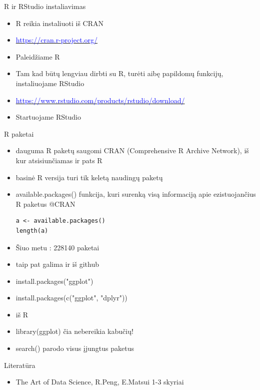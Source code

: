 \documentclass[11pt,xcolor=table]{beamer}
\begin{document}

\begin{frame}{R ir RStudio instaliavimas}
\begin{itemize}
\item R reikia instaliuoti iš CRAN
\item \href{https://cran.r-project.org/}{\textcolor{blue}{https://cran.r-project.org/}}
\item Paleidžiame R 
\item Tam kad būtų lengviau dirbti su R, turėti aibę papildomų funkcijų, instaliuojame RStudio
\item \href{https://www.rstudio.com/products/rstudio/download/}{\textcolor{blue}{https://www.rstudio.com/products/rstudio/download/}}
\item Startuojame RStudio
\end{itemize}
\end{frame}


\begin{frame}[fragile]{R paketai}
\begin{itemize}
\item dauguma R paketų saugomi CRAN (Comprehensive R Archive Network), iš kur atsisiunčiamas ir pats R
\item basinė R versija turi tik keletą naudingų paketų
\item available.packages() funkcija, kuri surenką visą informaciją apie ezistuojančius R paketus @CRAN
\begin{lstlisting}
a <- available.packages()
length(a)
\end{lstlisting}
\item Šiuo metu : 228140 paketai
\item taip pat galima ir iš github
\item install.packages("ggplot")
\item  install.packages(c("ggplot", "dplyr"))
\item iš R 
\item library(ggplot) čia nebereikia kabučių!
\item search() parodo visus įjungtus paketus
\end{itemize}
\end{frame}

\begin{frame}{Literatūra}
\begin{itemize}
\item The Art of Data Science, R.Peng, E.Matsui 1-3 skyriai
\end{itemize}
\end{frame}


\end{document}
